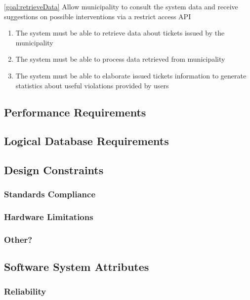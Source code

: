 \begin{description}
   			\item \ref{goal:retrieveData} Allow municipality to consult the system data and receive suggestions on possible interventions via a restrict access API 
   				\begin{enumerate}[resume*] 
  				\item The system must be able to retrieve data about tickets issued by the municipality 
   				\item The system must be able to process data retrieved from municipality
   				\item The system must be able to elaborate issued tickets information to generate statistics about useful violations provided by users
   			\end{enumerate}
   			
   	\end{description}

\subsection{Performance Requirements}

\subsection{Logical Database Requirements}

\subsection{Design Constraints}

\subsubsection{Standards Compliance}
\subsubsection{Hardware Limitations}
\subsubsection{Other?}

\subsection{Software System Attributes}

\subsubsection{Reliability}
